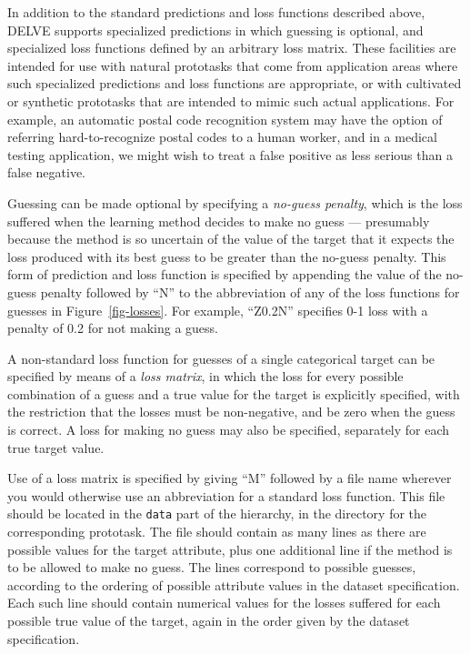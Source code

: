 In addition to the standard predictions and loss functions described
above, DELVE supports specialized predictions in which guessing is
optional, and specialized loss functions defined by an arbitrary loss
matrix.  These facilities are intended for use with natural prototasks
that come from application areas where such specialized predictions
and loss functions are appropriate, or with cultivated or synthetic
prototasks that are intended to mimic such actual applications.  For
example, an automatic postal code recognition system may have the
option of referring hard-to-recognize postal codes to a human worker,
and in a medical testing application, we might wish to treat a false
positive as less serious than a false negative.

Guessing can be made optional by specifying a {\em no-guess penalty},
which is the loss suffered when the learning method decides to make no
guess --- presumably because the method is so uncertain of the value
of the target that it expects the loss produced with its best guess to
be greater than the no-guess penalty.  This form of prediction and
loss function is specified by appending the value of the no-guess
penalty followed by ``N'' to the abbreviation of any of the loss
functions for guesses in Figure~\ref{fig-losses}.  For example,
``Z0.2N'' specifies 0-1 loss with a penalty of 0.2 for not making a
guess.

A non-standard loss function for guesses of a single categorical target
can be specified by means of a {\em loss matrix}, in which the
loss for every possible combination of a guess and a true value for
the target is explicitly specified, with the restriction that the
losses must be non-negative, and be zero when the guess is correct.
A loss for making no guess may also be specified, separately for
each true target value.  

Use of a loss matrix is specified by giving ``M'' followed by a file
name wherever you would otherwise use an abbreviation for a standard
loss function.  This file should be located in the {\tt data} part of
the \delve{} hierarchy, in the directory for the corresponding
prototask.  The file should contain as many lines as there are
possible values for the target attribute, plus one additional line if
the method is to be allowed to make no guess.  The lines correspond to
possible guesses, according to the ordering of possible attribute
values in the dataset specification.  Each such line should contain
numerical values for the losses suffered for each possible true value
of the target, again in the order given by the dataset specification.
